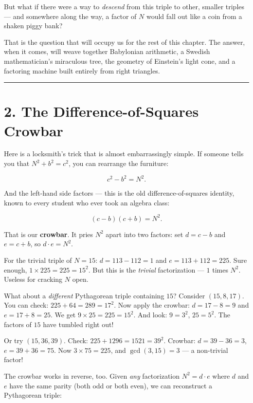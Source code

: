 \documentclass[11pt,openany]{book}
\theoremstyle{definition}
\theoremstyle{plain}
\theoremstyle{remark}
\begin{document}
But what if there were a way to \textit{descend} from this triple to other, smaller triples — and somewhere along the way, a factor of $N$ would fall out like a coin from a shaken piggy bank?

That is the question that will occupy us for the rest of this chapter. The answer, when it comes, will weave together Babylonian arithmetic, a Swedish mathematician's miraculous tree, the geometry of Einstein's light cone, and a factoring machine built entirely from right triangles.

\bigskip\noindent\rule{\textwidth}{0.4pt}\bigskip


\section{2. The Difference-of-Squares Crowbar}


Here is a locksmith's trick that is almost embarrassingly simple. If someone tells you that $N^2 + b^2 = c^2$, you can rearrange the furniture:

$$c^2 - b^2 = N^2.$$

And the left-hand side factors — this is the old difference-of-squares identity, known to every student who ever took an algebra class:

$$(c - b)(c + b) = N^2.$$

That is our \textbf{crowbar}. It pries $N^2$ apart into two factors: set $d = c - b$ and $e = c + b$, so $d \cdot e = N^2$.

For the trivial triple of $N = 15$: $d = 113 - 112 = 1$ and $e = 113 + 112 = 225$. Sure enough, $1 \times 225 = 225 = 15^2$. But this is the \textit{trivial} factorization — $1$ times $N^2$. Useless for cracking $N$ open.

What about a \textit{different} Pythagorean triple containing $15$? Consider $(15, 8, 17)$. You can check: $225 + 64 = 289 = 17^2$. Now apply the crowbar: $d = 17 - 8 = 9$ and $e = 17 + 8 = 25$. We get $9 \times 25 = 225 = 15^2$. And look: $9 = 3^2$, $25 = 5^2$. The factors of $15$ have tumbled right out!

Or try $(15, 36, 39)$. Check: $225 + 1296 = 1521 = 39^2$. Crowbar: $d = 39 - 36 = 3$, $e = 39 + 36 = 75$. Now $3 \times 75 = 225$, and $\gcd(3, 15) = 3$ — a non-trivial factor!

The crowbar works in reverse, too. Given \textit{any} factorization $N^2 = d \cdot e$ where $d$ and $e$ have the same parity (both odd or both even), we can reconstruct a Pythagorean triple:
\end{document}
